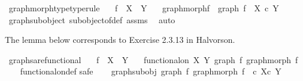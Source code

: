 \begin{isabellebody}
\isanewline
%
\endisadelimproof
\isanewline
{}\isamarkupfalse%
\ graph{\isacharunderscore}{\kern0pt}morph{\isacharunderscore}{\kern0pt}type{\isacharbrackleft}{\kern0pt}type{\isacharunderscore}{\kern0pt}rule{\isacharbrackright}{\kern0pt}{\isacharcolon}{\kern0pt}\isanewline
\ \ \ {\isachardoublequoteopen}f\ {\isacharcolon}{\kern0pt}\ X\ {\isasymrightarrow}\ Y{\isachardoublequoteclose}\isanewline
\ \ \ {\isachardoublequoteopen}graph{\isacharunderscore}{\kern0pt}morph{\isacharparenleft}{\kern0pt}f{\isacharparenright}{\kern0pt}\ {\isacharcolon}{\kern0pt}\ graph\ f\ {\isasymrightarrow}\ X\ {\isasymtimes}\isactrlsub c\ Y{\isachardoublequoteclose}\isanewline
%
\isadelimproof
\ \ %
\endisadelimproof
%
\isatagproof
{}\isamarkupfalse%
\ graph{\isacharunderscore}{\kern0pt}subobject\ subobject{\isacharunderscore}{\kern0pt}of{\isacharunderscore}{\kern0pt}def{}\ assms\ \isamarkupfalse%
\ auto%
\endisatagproof
{\isafoldproof}%
%
\isadelimproof
%
\endisadelimproof
%
\begin{isamarkuptext}%
The lemma below corresponds to Exercise 2.3.13 in Halvorson.%
\end{isamarkuptext}\isamarkuptrue%
\isamarkupfalse%
\ graphs{\isacharunderscore}{\kern0pt}are{\isacharunderscore}{\kern0pt}functional{\isacharcolon}{\kern0pt}\isanewline
\ \ \ {\isachardoublequoteopen}f\ {\isacharcolon}{\kern0pt}\ X\ {\isasymrightarrow}\ Y{\isachardoublequoteclose}\isanewline
\ \ \ {\isachardoublequoteopen}functional{\isacharunderscore}{\kern0pt}on\ X\ Y\ {\isacharparenleft}{\kern0pt}graph\ f{\isacharcomma}{\kern0pt}\ graph{\isacharunderscore}{\kern0pt}morph\ f{\isacharparenright}{\kern0pt}{\isachardoublequoteclose}\isanewline
%
\isadelimproof
\ \ %
\endisadelimproof
%
\isatagproof
{}\isamarkupfalse%
\ functional{\isacharunderscore}{\kern0pt}on{\isacharunderscore}{\kern0pt}def\isanewline
{}\isamarkupfalse%
{\isacharparenleft}{\kern0pt}safe{\isacharparenright}{\kern0pt}\isanewline
\ \ \isamarkupfalse%
\ graph{\isacharunderscore}{\kern0pt}subobj{\isacharcolon}{\kern0pt}\ {\isachardoublequoteopen}{\isacharparenleft}{\kern0pt}graph\ f{\isacharcomma}{\kern0pt}\ graph{\isacharunderscore}{\kern0pt}morph\ f{\isacharparenright}{\kern0pt}\ \ {\isasymsubseteq}\isactrlsub c\ {\isacharparenleft}{\kern0pt}X{\isasymtimes}\isactrlsub c\ Y{\isacharparenright}{\kern0pt}{\isachardoublequoteclose}\isanewline
\ \ \ \ \isamarkupfalse%

\end{isabellebody}
